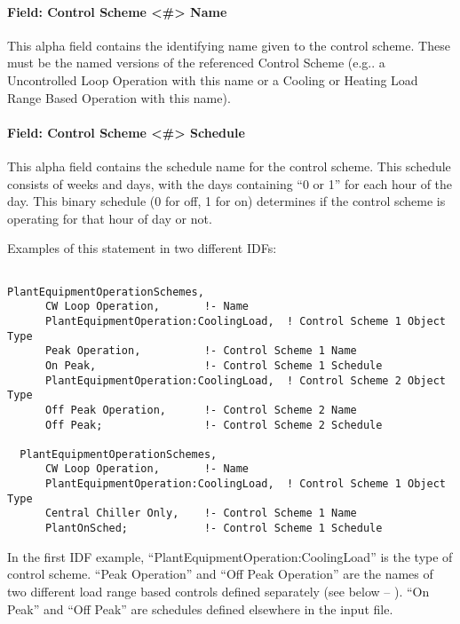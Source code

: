 \paragraph{Field: Control Scheme \textless{}\#\textgreater{} Name}\label{field-control-scheme-name}

This alpha field contains the identifying name given to the control scheme. These must be the named versions of the referenced Control Scheme (e.g.. a Uncontrolled Loop Operation with this name or a Cooling or Heating Load Range Based Operation with this name).

\paragraph{Field: Control Scheme \textless{}\#\textgreater{} Schedule}\label{field-control-scheme-schedule}

This alpha field contains the schedule name for the control scheme. This schedule consists of weeks and days, with the days containing ``0 or 1'' for each hour of the day. This binary schedule (0 for off, 1 for on) determines if the control scheme is operating for that hour of day or not.

Examples of this statement in two different IDFs:

\begin{lstlisting}

PlantEquipmentOperationSchemes,
      CW Loop Operation,       !- Name
      PlantEquipmentOperation:CoolingLoad,  ! Control Scheme 1 Object Type
      Peak Operation,          !- Control Scheme 1 Name
      On Peak,                 !- Control Scheme 1 Schedule
      PlantEquipmentOperation:CoolingLoad,  ! Control Scheme 2 Object Type
      Off Peak Operation,      !- Control Scheme 2 Name
      Off Peak;                !- Control Scheme 2 Schedule

  PlantEquipmentOperationSchemes,
      CW Loop Operation,       !- Name
      PlantEquipmentOperation:CoolingLoad,  ! Control Scheme 1 Object Type
      Central Chiller Only,    !- Control Scheme 1 Name
      PlantOnSched;            !- Control Scheme 1 Schedule
\end{lstlisting}

In the first IDF example, ``PlantEquipmentOperation:CoolingLoad'' is the type of control scheme. ``Peak Operation'' and ``Off Peak Operation'' are the names of two different load range based controls defined separately (see below -- ). ``On Peak'' and ``Off Peak'' are schedules defined elsewhere in the input file.

